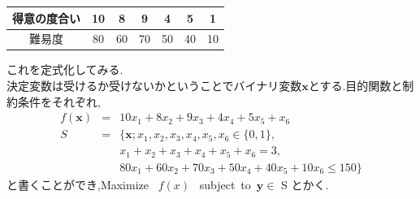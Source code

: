 \documentclass[12pt]{jarticle}
\begin{document}
\begin{description}
\begin{table}[h]
\begin{center}
\begin{tabular}{|c|c|c|c|c|c|c|}
				      \hline
				      得意の度合い & 10    & 8     & 9     & 4     & 5     & 1     \\
				      \hline
				      難易度       & 80    & 60    & 70    & 50    & 40    & 10    \\
				      \hline
			      \end{tabular}
		      \end{center}
	      \end{table}
	      これを定式化してみる.\\
	      決定変数は受けるか受けないかということでバイナリ変数$\boldsymbol{x}$とする.目的関数と制約条件をそれぞれ,
	      \begin{eqnarray}
		      f(\boldsymbol{x})&=&10x_1+8x_2+9x_3+4x_4+5x_5+x_6\nonumber\\
		      S&=&\{\boldsymbol{x};x_1,x_2,x_3,x_4,x_5,x_6\in \{0,1\},\nonumber\\
		      &&x_1+x_2+x_3+x_4+x_5+x_6=3,\nonumber\\
		      &&80x_1+60x_2+70x_3+50x_4+40x_5+10x_6\leq 150\}\nonumber
	      \end{eqnarray}
	      と書くことができ,Maximize \ $f(x)$ \ subject\ to\ $\boldsymbol{y}\in$ S とかく.       
\end{description}
\end{document}
